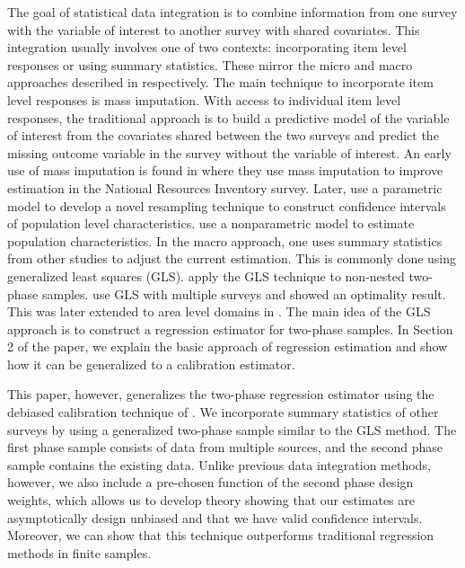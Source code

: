 \documentclass[12pt]{article}
\begin{document}
The goal of statistical data integration is to combine information from one
survey with the variable of interest to another survey with
shared covariates. 
This integration usually involves one of two contexts: incorporating item
level responses or using summary statistics. These mirror the micro and macro
approaches described in \cite{yang2020statistical} respectively. The main
technique to incorporate item level responses is mass imputation. With access to
individual item level responses, the traditional approach is to build a
predictive model of the variable of interest from the covariates shared between
the two surveys and predict the missing outcome variable in the survey without
the variable of interest. An early use of mass imputation is found in
\cite{breidt1996two} where they use mass imputation to improve estimation in
the National Resources Inventory survey. Later, \cite{kim2012combining} use a
parametric model to develop a novel resampling technique to construct confidence
intervals of population level characteristics. \cite{chen2022nonparametric} use
a nonparametric model to estimate population characteristics. In the macro
approach, one uses summary statistics from other studies to adjust the current
estimation. This is commonly done using generalized least squares (GLS).
\cite{hidiroglou2001double} apply the GLS technique to non-nested two-phase
samples. \cite{merkouris2004combining} use GLS with multiple surveys and showed
an optimality result. This was later extended to area level domains in
\cite{merkouris2010combining}. The main idea of the GLS approach is to construct
a regression estimator for two-phase samples. In Section 2 of the paper, we
explain the basic approach of regression estimation and show how it can be
generalized to a calibration estimator.

This paper, however, generalizes the two-phase regression estimator using the
debiased calibration technique of \cite{kwon2024debiased}.
We incorporate summary statistics of other surveys by
using a generalized two-phase sample similar to the GLS method. The first phase
sample consists of data
from multiple sources, and the second phase sample contains the existing
data. Unlike previous data integration methods, however, we also include a
pre-chosen function of the second phase design weights, which allows us to
develop theory showing that our
estimates are asymptotically design unbiased and that we have valid confidence
intervals. Moreover, we can show that this technique outperforms traditional
regression methods in finite samples.
\end{document}
